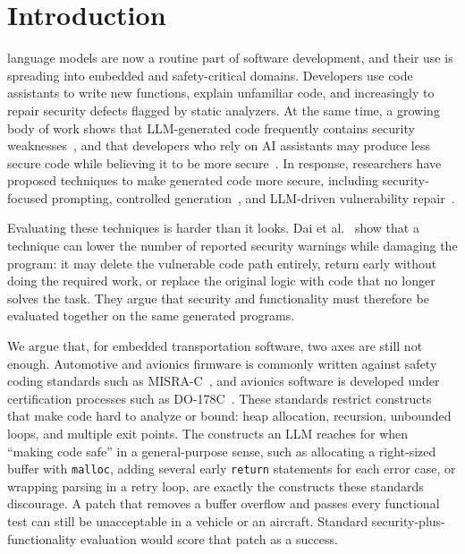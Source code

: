 \documentclass[12pt]{IEEEtran}
\begin{document}
\section{Introduction}
 language models are now a routine part of software development, and their use is spreading into embedded and safety-critical domains. Developers use code assistants to write new functions, explain unfamiliar code, and increasingly to repair security defects flagged by static analyzers. At the same time, a growing body of work shows that LLM-generated code frequently contains security weaknesses~\cite{pearce2022asleep, khoury2023chatgpt, tihanyi2023formai}, and that developers who rely on AI assistants may produce less secure code while believing it to be more secure~\cite{perry2023users}. In response, researchers have proposed techniques to make generated code more secure, including security-focused prompting, controlled generation~\cite{he2023sven}, and LLM-driven vulnerability repair~\cite{pearce2023zeroshot}.

Evaluating these techniques is harder than it looks. Dai et al.~\cite{rethinking2026} show that a technique can lower the number of reported security warnings while damaging the program: it may delete the vulnerable code path entirely, return early without doing the required work, or replace the original logic with code that no longer solves the task. They argue that security and functionality must therefore be evaluated together on the same generated programs.

We argue that, for embedded transportation software, two axes are still not enough. Automotive and avionics firmware is commonly written against safety coding standards such as MISRA-C~\cite{misra2012}, and avionics software is developed under certification processes such as DO-178C~\cite{do178c}. These standards restrict constructs that make code hard to analyze or bound: heap allocation, recursion, unbounded loops, and multiple exit points. The constructs an LLM reaches for when ``making code safe'' in a general-purpose sense, such as allocating a right-sized buffer with \texttt{malloc}, adding several early \texttt{return} statements for each error case, or wrapping parsing in a retry loop, are exactly the constructs these standards discourage. A patch that removes a buffer overflow and passes every functional test can still be unacceptable in a vehicle or an aircraft. Standard security-plus-functionality evaluation would score that patch as a success.
\end{document}
